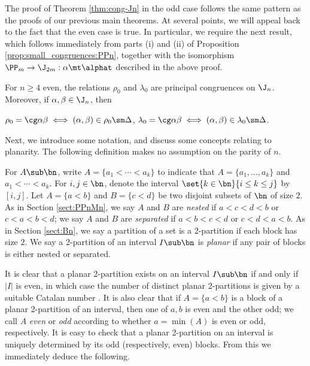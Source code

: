 The proof of Theorem \ref{thm:cong-Jn} in the odd case follows the same pattern as the proofs of our previous main theorems.  At several points, we will appeal back to the fact that the even case is true.  In particular, we require the next result, which follows immediately from parts (i) and (ii) of Proposition \ref{prop:small_congruences:PPn}, together with the isomorphism $\PP_m\to\J_{2m}:\alpha\mt\alphat$ described in the above proof.

\newpage

\begin{prop}
\label{prop:rlJeven}
For $n\geq4$ even, the relations $\rho_0$ and $\lambda_0$ are principal congruences on $\J_n$.  Moreover, if $\alpha,\beta\in\J_n$, then
\begin{itemize}\begin{multicols}{2}
 $\rho_0=\cg\alpha\beta\iff (\alpha,\beta)\in\rho_0\sm\Delta$, 
 $\lambda_0=\cg\alpha\beta\iff (\alpha,\beta)\in\lambda_0\sm\Delta$.
\epfres
\end{multicols}\end{itemize}
\end{prop}



Next, we introduce some notation, and discuss some concepts relating to planarity.  The following definition makes no assumption on the parity of $n$.

\begin{defn}
For $A\sub\bn$, write $A=\{a_1<\cdots<a_k\}$ to indicate that $A=\{a_1,\ldots,a_k\}$ and $a_1<\cdots<a_k$.  For $i,j\in\bn$, denote the interval $\set{k\in\bn}{i\leq k\leq j}$ by~$[i,j]$.  
%
Let $A=\{a<b\}$ and $B=\{c<d\}$ be two disjoint subsets of $\bn$ of size $2$.  As in Section \ref{sect:PPnMn}, we say $A$ and $B$ are \emph{nested} if $a<c<d<b$ or $c<a<b<d$; we say $A$ and $B$ are \emph{separated} if $a<b<c<d$ or $c<d<a<b$.  As in Section \ref{sect:Bn}, we say a partition of a set is a 2-partition if each block has size $2$.  We say a 2-partition of an interval $I\sub\bn$ is \emph{planar} if any pair of blocks is either nested or separated.  
\end{defn}


It is clear that a planar 2-partition exists on an interval $I\sub\bn$ if and only if $|I|$ is even, in which case the number of distinct planar 2-partitions is given by a suitable Catalan number \cite[Sequence A000108]{OEIS}.  
It is also clear that if $A=\{a<b\}$ is a block of a planar 2-partition of an interval, then one of $a,b$ is even and the other odd;
%
we call $A$ \emph{even} or \emph{odd} according to whether $a=\min(A)$ is even or odd, respectively.
It is easy to check that a planar 2-partition on an interval is uniquely determined by its odd (respectively, even) blocks. 
%
From this we immediately deduce the following.


